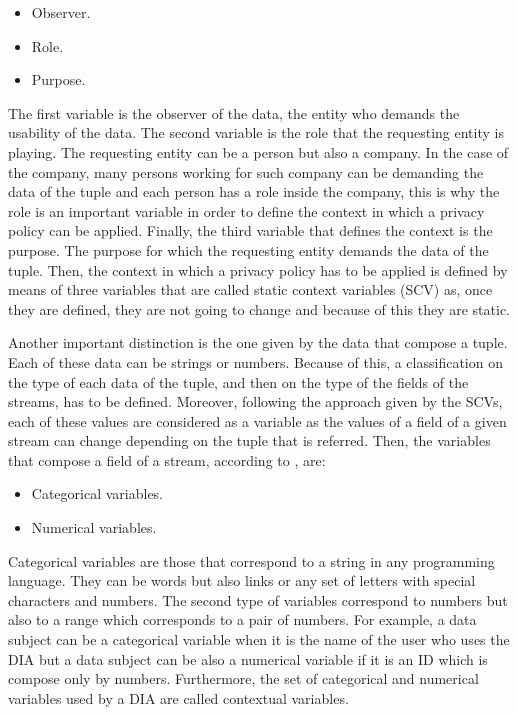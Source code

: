 \begin{itemize}

\item Observer.
\item Role.
\item Purpose.

\end{itemize}

The first variable is the observer of the data, the entity who demands the usability of the data. The second variable is the role that the requesting entity is playing. The requesting entity can be a person but also a company. In the case of the company, many persons working for such company can be demanding the data of the tuple and each person has a role inside the company, this is why the role is an important variable in order to define the context in which a privacy policy can be applied. Finally, the third variable that defines the context is the purpose. The purpose for which the requesting entity demands the data of the tuple. Then, the context in which a privacy policy has to be applied is defined by means of three variables that are called static context variables (SCV) as, once they are defined, they are not going to change and because of this they are static.

Another important distinction is the one given by the data that compose a tuple. Each of these data can be strings or numbers. Because of this, a classification on the type of each data of the tuple, and then on the type of the fields of the streams, has to be defined. Moreover, following the approach given by the SCVs, each of these values are considered as a variable as the values of a field of a given stream can change depending on the tuple that is referred. Then, the variables that compose a field of a stream, according to \cite{privacypoliciesarticle}, are:

\begin{itemize}

\item Categorical variables.
\item Numerical variables.

\end{itemize}

Categorical variables are those that correspond to a string in any programming language. They can be words but also links or any set of letters with special characters and numbers. The second type of variables correspond to numbers but also to a range which corresponds to a pair of numbers. For example, a data subject can be a categorical variable when it is the name of the user who uses the DIA but a data subject can be also a numerical variable if it is an ID which is compose only by numbers. Furthermore, the set of categorical and numerical variables used by a DIA are called contextual variables.

